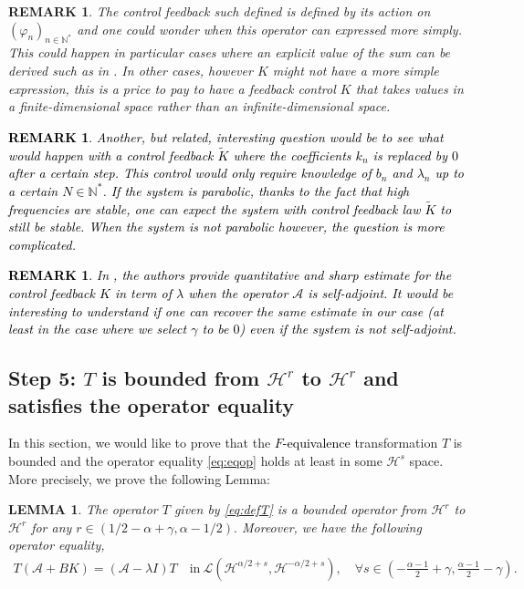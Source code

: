 \documentclass[11pt, dvipsnames]{amsart}
\newtheorem{rmk}[theorem]{REMARK}
\newtheorem{lem}[theorem]{LEMMA}
\begin{document}
{\color{black}
\begin{rmk}
 The control feedback such defined is defined by its action on $(\varphi_{n})_{n\in\mathbb{N}^{*}}$ and one could wonder when this operator can expressed more simply. This could happen in particular cases where an explicit value of the sum can be derived such as in \cite{zhang2022internal}. In other cases, however $K$ might not have a more simple expression, this is a price to pay to have a feedback control $K$ that takes values in a finite-dimensional space rather than an infinite-dimensional space. 
\end{rmk}
}
\textcolor{black}{\begin{rmk}
    Another, but related, interesting question would be to see what would happen with a control feedback $\tilde{K}$ where the coefficients $k_{n}$ is replaced by $0$ after a certain step. This control would only require knowledge of $b_{n}$ and $\lambda_{n}$ up to a certain $N\in\mathbb{N}^{*}$. If the system is parabolic, thanks to the fact that high frequencies are stable, one can expect the system with control feedback law $\tilde{K}$ to still be stable. When the system is not parabolic however, the question is more complicated.
\end{rmk}}
\textcolor{black}{\begin{rmk}
    In \cite{Gagnon2025abstract}, the authors provide quantitative and sharp estimate for the control feedback $K$ in term of $\lambda$ when the operator $\mathcal{A}$ is self-adjoint. It would be interesting to understand if one can recover the same estimate in our case (at least in the case where we select $\gamma$ to be $0$) even if the system is not self-adjoint. 
\end{rmk}}

\subsection{Step 5: {\color{black} $T$ is bounded from $\mathcal{H}^{r}$ to $\mathcal{H}^{r}$ and satisfies the operator equality}}\label{sec:step5*}
In this section, we would like to prove that the \textcolor{black}{$F$-equivalence} transformation $T$ is bounded and the operator equality \eqref{eq:eqop} holds at least in some $\mathcal{H}^s$ space. More precisely, we prove the following Lemma:
\begin{lem}\label{Lemma-T-bounded}
    The operator $T$ given by \eqref{eq:defT} is a bounded operator from $\mathcal{H}^r$ to $\mathcal{H}^r$ for any $r\in(1/2-\alpha+\gamma,\alpha-1/2).$ Moreover, we have the following operator equality,
    \begin{align}
     T(\mathcal{A}+BK)=(\mathcal{A}-\lambda I)T\quad \text{in}\ \mathcal{L}(\mathcal{H}^{\alpha/2+s},\mathcal{H}^{-\alpha/2+s}), \quad \forall s\in \left(-\frac{\alpha-1}{2}+\gamma,\frac{\alpha-1}{2}-\gamma\right).  \label{opeq-space}
    \end{align}
\end{lem}
\end{document}
